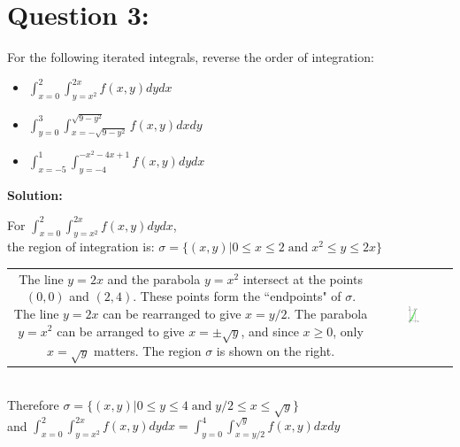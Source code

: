 \documentclass{article}
\newcommand{\dr}[1]{\textcolor{dark_red}{#1}}
\begin{document}
\section*{Question 3:}

For the following iterated integrals, reverse the order of integration:

\begin{itemize}
\item \(\int_{x = 0}^2 \int_{y = x^2}^{2x} f(x,y)dydx\)
\item \(\int_{y = 0}^3 \int_{x = -\sqrt{9 - y^2}}^{\sqrt{9 - y^2}} f(x,y)dxdy\)
\item \(\int_{x = -5}^1 \int_{y = -4}^{-x^2 - 4x + 1} f(x,y)dydx\)
\end{itemize}



\vspace{5mm}
\dr{\textbf{Solution:}}

\dr{\begin{framed}
For \(\int_{x = 0}^2 \int_{y = x^2}^{2x} f(x,y)dydx\), \\
the region of integration is: \(\sigma = \{(x,y) | 0 \leq x \leq 2 \;\text{and}\; x^2 \leq y \leq 2x\}\) \\
\begin{tabular}{cc}
\parbox{0.6\textwidth}{
The line \(y = 2x\) and the parabola \(y = x^2\) intersect at the points \((0,0)\) and \((2,4)\). These points form the ``endpoints" of \(\sigma\). The line \(y = 2x\) can be rearranged to give \(x = y/2\). The parabola \(y = x^2\) can be arranged to give \(x = \pm \sqrt{y}\), and since \(x \geq 0\), only \(x = \sqrt{y}\) matters. The region \(\sigma\) is shown on the right.
} & \parbox{0.4\textwidth}{
\includegraphics[width = 0.2\textwidth]{Test_bench_part_3x_images/Test_bench_part_3x_Solutions_image_13}
} 
\end{tabular} \\
Therefore \(\sigma = \{(x,y) | 0 \leq y \leq 4 \;\text{and}\; y/2 \leq x \leq \sqrt{y}\}\) \\ 
and \(\int_{x = 0}^2 \int_{y = x^2}^{2x} f(x,y)dydx = \int_{y = 0}^4 \int_{x = y/2}^{\sqrt{y}} f(x,y)dxdy\)
\end{framed}}
\end{document}

